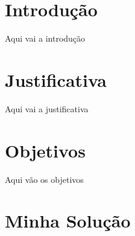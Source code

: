 \documentclass[
	12pt,				%
	openright,			%
	oneside,			%
	a4paper,			%
	english,			%
	french,				%
	spanish,			%
	brazil,				%
	]{abntex2}
\begin{document}
\frenchspacing 


\imprimircapa

\imprimirfolhaderosto


\tableofcontents
\cleardoublepage


\textual

\chapter{Introdução}

Aqui vai a introdução

\chapter{Justificativa}

Aqui vai a justificativa

\chapter{Objetivos}

Aqui vão os objetivos

\chapter{Minha Solução}
\end{document}
